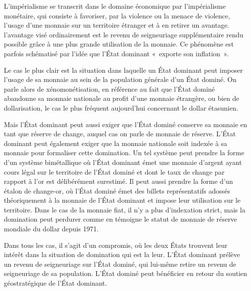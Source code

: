 L'impérialisme se transcrit dans le domaine économique par l'impérialisme monétaire, qui consiste à favoriser, par la violence ou la menace de violence, l'usage d'une monnaie sur un territoire étranger et à en retirer un avantage. l'avantage visé ordinairement est le revenu de seigneuriage supplémentaire rendu possible grâce à une plus grande utilisation de la monnaie. Ce phénomène est parfois schématisé par l'idée que l'État dominant «~exporte son inflation~».

Le cas le plus clair est la situation dans laquelle un État dominant peut imposer l'usage de sa monnaie au sein de la population générale d'un État dominé. On parle alors de xénomonétisation, en référence au fait que l'État dominé abandonne sa monnaie nationale au profit d'une monnaie étrangère, ou bien de dollarisation, le cas le plus fréquent aujourd'hui concernant le dollar étasunien.

Mais l'État dominant peut aussi exiger que l'État dominé conserve sa monnaie en tant que réserve de change, auquel cas on parle de monnaie de réserve. L'État dominant peut également exiger que la monnaie nationale soit indexée à sa monnaie pour formaliser cette domination. Un tel système peut prendre la forme d'un système bimétallique où l'État dominant émet une monnaie d'argent ayant cours légal sur le territoire de l'État dominé et dont le taux de change par rapport à l'or est délibérément surestimé. Il peut aussi prendre la forme d'un étalon de change-or, où l'État dominé émet des billets représentatifs adossés théoriquement à la monnaie de l'État dominant et impose leur utilisation sur le territoire. Dans le cas de la monnaie fiat, il n'y a plus d'indexation strict, mais la domination peut perdurer comme en témoigne le statut de monnaie de réserve mondiale du dollar depuis 1971.

Dans tous les cas, il s'agit d'un compromis, où les deux États trouvent leur intérêt dans la situation de domination qui est la leur. L'État dominant prélève un revenu de seigneuriage sur l'État dominé, qui lui-même retire un revenu de seigneuriage de sa population. L'État dominé peut bénéficier en retour du soutien géostratégique de l'État dominant.

